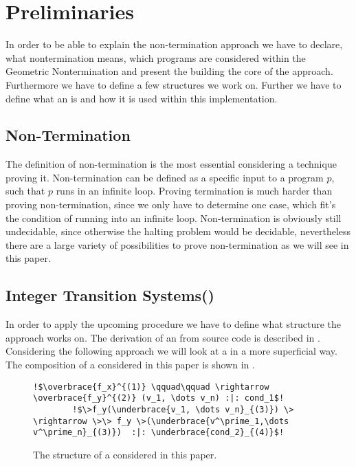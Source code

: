 \chapter{Preliminaries}
\label{chapter:preliminaries}

In order to be able to explain the non-termination approach we have to declare, what nontermination means, which programs are considered within the Geometric Nontermination and present the \gna building the core of the approach. Furthermore we have to define a few structures we work on. Further we have to define what an \solver is and how it is used within this implementation.

\section{Non-Termination}
The definition of non-termination is the most essential considering a technique proving it. Non-termination can be defined as a specific input to a program $p$, such that $p$ runs in an infinite loop.
Proving termination is much harder than proving non-termination, since we only have to determine one case, which fit's the condition of running into an infinite loop. \newline
Non-termination is obviously still undecidable, since otherwise the halting problem would be decidable, nevertheless there are a large variety of possibilities to prove non-termination as we will see in this paper.

\section{Integer Transition Systems(\its)}
\label{sec:its}
In order to apply the upcoming procedure we have to define what structure the approach works on. The derivation of an \its from source code is described in . Considering the following approach we will look at a \its in a more superficial way. The composition of a \its considered in this paper is shown in .\newline
\begin{figure}[H]
	\begin{lstlisting}[escapechar=!]
		!$\overbrace{f_x}^{(1)} \qquad\qquad \rightarrow \overbrace{f_y}^{(2)} (v_1, \dots v_n) :|: cond_1$!
		!$\>f_y(\underbrace{v_1, \dots v_n}_{(3)}) \> \rightarrow \>\> f_y \>(\underbrace{v^\prime_1,\dots v^\prime_n}_{(3)})  :|: \underbrace{cond_2}_{(4)}$!
	\end{lstlisting}
	\caption{The structure of a \its considered in this paper.}
	\label{fig:its-structure}
\end{figure}

